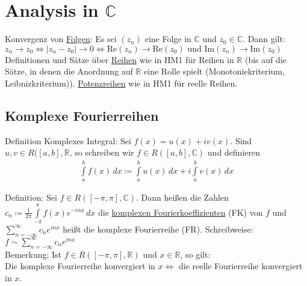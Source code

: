 \section{Analysis in $\mathbb{C}$}
Konvergenz von \underline{Folgen}: Es sei $(z_n)$ eine Folge in $\mathbb{C}$ und $z_0 \in \mathbb{C}$. Dann gilt: 
$z_n \to z_0 \Leftrightarrow \lvert z_n - z_0 \rvert \to 0 \Leftrightarrow \text{Re}(z_n) \to \text{Re}(z_0) 
\text{ und Im}(z_n) \to \text{Im}(z_0)$ \\
Definitionen und Sätze über \underline{Reihen} wie in HM1 für Reihen in $\mathbb{R}$ (bis auf die Sätze, in denen die Anordnung auf $\mathbb{R}$
eine Rolle spielt (Monotoniekriterium, Leibnizkriterium)). \underline{Potenzreihen} wie in HM1 für reelle Reihen. 

\subsection{Komplexe Fourierreihen}
Definition Komplexes Integral:
Sei $f(x)=u(x) + iv(x)$. Sind $u,v \in R([a,b],\mathbb{R}$, so schreiben wir $f \in R([a,b],\mathbb{C})$ und definieren
\begin{align*}
    \int \limits_a^b f(x)\,dx \coloneqq \int \limits_a^b u(x)\,dx + i \int \limits_a^b v(x)\,dx
\end{align*}

Definition: Sei $f \in R([-\pi,\pi],\mathbb{C})$. Dann heißen die Zahlen $c_n \coloneqq \frac{1}{2\pi} \int \limits_{-\pi}^{\pi} f(x) e^{-inx}\,dx$
die \underline{komplexen Fourierkoeffizienten} (FK) von $f$ und $\sum \limits_{n= - \infty}^{\infty} c_n e^{inx}$ heißt
die komplexe Fourierreihe (FR). Schreibweise: $f \sim \sum \limits_{n=- \infty}^{\infty} c_n e^{inx}$ \\
Bemerkung: Ist $f \in R([-\pi, \pi], \mathbb{R}) \text{ und } x \in \mathbb{R}$, so gilt: \\
Die komplexe Fourierreihe konvergiert in $x \Leftrightarrow$ die reelle Fourierreihe konvergiert in $x$.